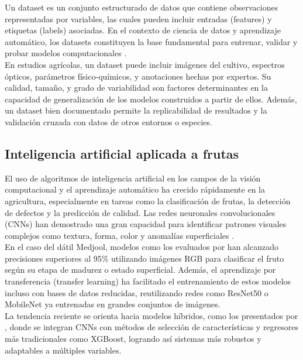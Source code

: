 Un dataset es un conjunto estructurado de datos que contiene observaciones representadas por variables, las cuales pueden incluir entradas (features) y etiquetas (labels) asociadas. En el contexto de ciencia de datos y aprendizaje automático, los datasets constituyen la base fundamental para entrenar, validar y probar modelos computacionales \parencite{kamilaris_deep_2018}.\\

En estudios agrícolas, un dataset puede incluir imágenes del cultivo, espectros ópticos, parámetros físico-químicos, y anotaciones hechas por expertos. Su calidad, tamaño, y grado de variabilidad son factores determinantes en la capacidad de generalización de los modelos construidos a partir de ellos. Además, un dataset bien documentado permite la replicabilidad de resultados y la validación cruzada con datos de otros entornos o especies.

\subsection{Inteligencia artificial aplicada a frutas}

El uso de algoritmos de inteligencia artificial en los campos de la visión computacional y el aprendizaje automático ha crecido rápidamente en la agricultura, especialmente en tareas como la clasificación de frutas, la detección de defectos y la predicción de calidad. Las redes neuronales convolucionales (CNNs) han demostrado una gran capacidad para identificar patrones visuales complejos como textura, forma, color y anomalías superficiales \parencite{albarrak_deep_2022, alsirhani_novel_2023}.\\

En el caso del dátil Medjool, modelos como los evaluados por \parencite{almomen_date_2023} han alcanzado precisiones superiores al 95\% utilizando imágenes RGB para clasificar el fruto según su etapa de madurez o estado superficial. Además, el aprendizaje por transferencia (transfer learning) ha facilitado el entrenamiento de estos modelos incluso con bases de datos reducidas, reutilizando redes como ResNet50 o MobileNet ya entrenadas en grandes conjuntos de imágenes.\\

La tendencia reciente se orienta hacia modelos híbridos, como los presentados por \parencite{said_smartripen_2025}, donde se integran CNNs con métodos de selección de características y regresores más tradicionales como XGBoost, logrando así sistemas más robustos y adaptables a múltiples variables.

